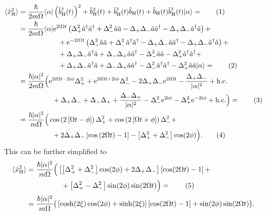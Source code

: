 \documentclass[english, parskip=full]{scrartcl}
\newcommand\numberthis{\addtocounter{equation}{1}\tag{\theequation}}
\newcommand{\bra}{}
\newcommand{\braket}{}
\newcommand{\kla}{}
\newcommand{\klam}{}
\newcommand{\tecxt}{}
\renewcommand{\i}{\text{i}}
\newcommand{\e}{\text{e}}
\begin{document}
\begin{align*}
\bra\langle \hat{x}_\tecxt\text{H}^2 \rangle &= \frac{\hbar}{2m\Omega}\braket\langle \alpha | \kla\left( \hat{b}_\tecxt\text{H}^\dagger (t) \right)^2 + \hat{b}_\tecxt\text{H}^2(t) + \hat{b}_\tecxt\text{H}^\dagger(t)\hat{b}_\tecxt\text{H}(t)  + \hat{b}_\tecxt\text{H}(t)\hat{b}_\tecxt\text{H}^\dagger(t) | \alpha \rangle =  \numberthis\\
&= \frac{\hbar}{2m\Omega}\braket\langle \alpha | \e^{2\i\Omega t}  \kla\left( \Delta_+^2\hat{a}^\dagger \hat{a}^\dagger + \Delta_-^2 \hat{a}\hat{a} - \Delta_+\Delta_-\hat{a}\hat{a}^\dagger - \Delta_+\Delta_-\hat{a}^\dagger\hat{a} \right) + \\
&\hspace{2cm}  + \e^{-2\i\Omega t}\kla\left( \Delta_+^2\hat{a}\hat{a} + \Delta_-^2 \hat{a}^\dagger\hat{a}^\dagger - \Delta_+\Delta_-\hat{a}\hat{a}^\dagger - \Delta_+\Delta_-\hat{a}^\dagger\hat{a} \right) + \\
&\hspace{2cm} + \Delta_+\Delta_-\hat{a}^\dagger\hat{a} + \Delta_-\Delta_+\hat{a}\hat{a}^\dagger - \Delta_-^2\hat{a}\hat{a} - \Delta_+^2\hat{a}^\dagger\hat{a}^\dagger + \\
&\hspace{2cm} + \Delta_+\Delta_-\hat{a}^\dagger\hat{a} + \Delta_-\Delta_+\hat{a}\hat{a}^\dagger - \Delta_-^2\hat{a}^\dagger\hat{a}^\dagger - \Delta_+^2\hat{a}\hat{a}  | \alpha \rangle =  \numberthis\\
&= \frac{\hbar|\alpha|^2}{2m\Omega}\Big( \e^{2\i\Omega t - 2\i\phi}\Delta_+^2 + \e^{2\i\Omega t + 2\i\phi}\Delta_-^2 - 2\Delta_+\Delta_- \e^{2\i\Omega t} - \frac{\Delta_+\Delta_-}{|\alpha|^2}  + \tecxt\text{h.c.}\\
&\hspace{1.7cm} + \Delta_+\Delta_- + \Delta_-\Delta_+ + \frac{\Delta_-\Delta_+}{|\alpha|^2} - \Delta_-^2\e^{2\i\phi} - \Delta_+^2\e^{-2\i\phi}   + \tecxt\text{h.c.}  \Big) = \numberthis\\
&= \frac{\hbar|\alpha|^2}{m\Omega}\kla\Big( \cos\kla\left( 2\klam\left[ \Omega t - \phi \right] \right)\Delta_+^2 + \cos\kla\left( 2\klam\left[ \Omega t + \phi \right] \right)\Delta_-^2 + \\
&\hspace{1.7cm} + 2\Delta_+\Delta_- \klam\left[ \cos\kla\left( 2\Omega t \right) - 1 \right] - \klam\left[ \Delta_+^2 + \Delta_-^2 \right]\cos (2\phi) \Big). \numberthis
\end{align*}
This can be further simplified to
\begin{align*}
\bra\langle \hat{x}_\tecxt\text{H}^2 \rangle &= \frac{\hbar|\alpha|^2}{m\Omega} \Big( \klam\left[ \klam\left[ \Delta_+^2 + \Delta_-^2 \right]\cos(2\phi) + 2\Delta_+\Delta_- \right] \klam\left[ \cos(2\Omega t) - 1 \right] + \\
&\hspace{1.7cm} + \klam\left[ \Delta_+^2 - \Delta_-^2 \right]\sin (2\phi)\sin(2\Omega t) \Big) = \numberthis\\
&= \frac{\hbar|\alpha|^2}{m\Omega}\kla\big( \klam\left[ \cosh(2\xi)\cos(2\phi) + \sinh(2\xi) \right]\klam\left[ \cos(2\Omega t) - 1 \right] +  \sin (2\phi)\sin(2\Omega t) \big).
\end{align*}
\end{document}
